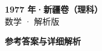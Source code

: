 \documentclass[zihao=-4, a4paper]{ctexart}
\begin{document}
\begin{center}
  {\Large\bfseries 1977 年·新疆卷（理科）}\\[4pt]
  {\large 数学 · 解析版}
\end{center}
\medskip
{}

\clearpage
{}
\begin{center}{\Large\bfseries 参考答案与详细解析}\end{center}
\medskip

\end{document}
